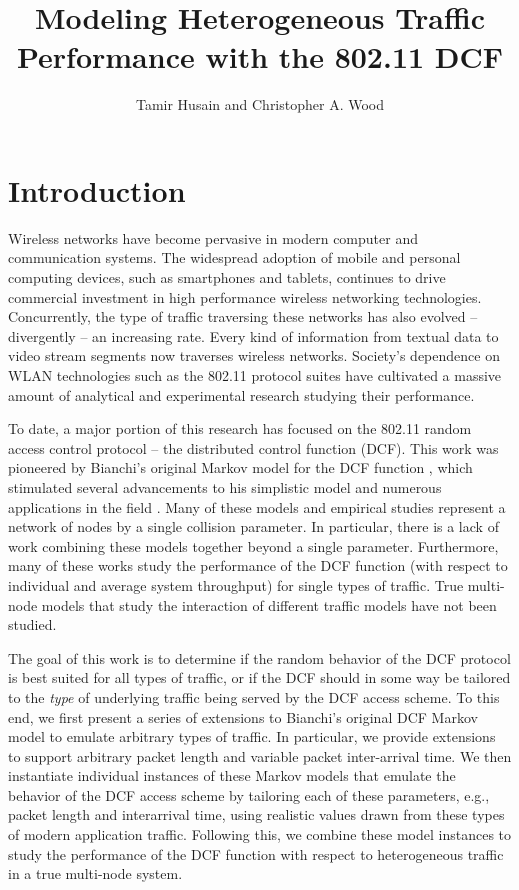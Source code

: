 \documentclass{llncs}
\begin{document}
\mainmatter
\title{Modeling Heterogeneous Traffic Performance with the 802.11 DCF}
\author{Tamir Husain and Christopher A. Wood}
\maketitle

\begin{abstract}
\end{abstract}

\section{Introduction}
Wireless networks have become pervasive in modern computer and communication systems. The widespread adoption of mobile and personal computing devices, such as smartphones and tablets, continues to drive commercial investment in high performance wireless networking technologies. Concurrently, the type of traffic traversing these networks has also evolved -- divergently -- an increasing rate. Every kind of information from textual data to video stream segments now traverses wireless networks. Society's dependence on WLAN technologies such as the 802.11 protocol suites have cultivated a massive amount of analytical and experimental research studying their performance. 

To date, a major portion of this research has focused on the 802.11 random access control protocol -- the distributed control function (DCF). This work was pioneered by Bianchi's original Markov model for the DCF function \cite{bianchi1996performance}, which stimulated several advancements to his simplistic model \cite{bianchi1998ieee} and numerous applications in the field \cite{crow1996performance,chhaya1997performance}. Many of these models and empirical studies represent a network of nodes by a single collision parameter. In particular, there is a lack of work combining these models together beyond a single parameter. Furthermore, many of these works study the performance of the DCF function (with respect to individual and average system throughput) for single types of traffic. True multi-node models that study the interaction of different traffic models have not been studied.

The goal of this work is to determine if the random behavior of the DCF protocol is best suited for all types of traffic, or if the DCF should in some way be tailored to the \emph{type} of underlying traffic being served by the DCF access scheme. To this end, we first present a series of extensions to Bianchi's original DCF Markov model to emulate arbitrary types of traffic. In particular, we provide extensions to support arbitrary packet length and variable packet inter-arrival time. We then instantiate individual instances of these Markov models that emulate the behavior of the DCF access scheme by tailoring each of these parameters, e.g., packet length and interarrival time, using realistic values drawn from these types of modern application traffic. Following this, we combine these model instances to study the performance of the DCF function with respect to heterogeneous traffic in a true multi-node system. 
\end{document}
